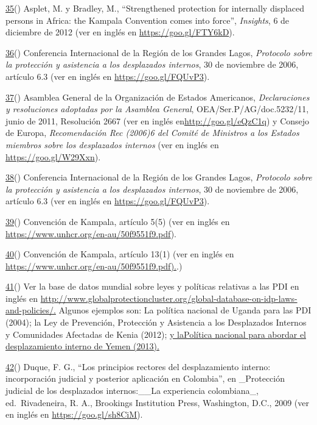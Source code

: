 \documentclass[
]{book}
\begin{document}
\protect\hyperlink{sdfootnote35anc}{35}() Asplet, M. y Bradley, M., ``Strengthened protection for internally displaced persons in Africa: the Kampala Convention comes into force'', \emph{Insights}, 6 de diciembre de 2012 (ver en inglés en \url{https://goo.gl/FTY6kD}).

\protect\hyperlink{sdfootnote36anc}{36}() Conferencia Internacional de la Región de los Grandes Lagos, \emph{Protocolo sobre la protección y asistencia a los desplazados internos}, 30 de noviembre de 2006, artículo 6.3 (ver en inglés en \url{https://goo.gl/FQUvP3}).

\protect\hyperlink{sdfootnote37anc}{37}() Asamblea General de la Organización de Estados Americanos, \emph{Declaraciones y resoluciones adoptadas por la Asamblea General}, OEA/Ser.P/AG/doc.5232/11, junio de 2011, Resolución 2667 (ver en inglés en\url{http://goo.gl/eQzC1q}) y Consejo de Europa, \emph{Recomendación Rec (2006)6 del Comité de Ministros a los Estados miembros sobre los desplazados internos} (ver en inglés en \url{https://goo.gl/W29Xxn}).

\protect\hyperlink{sdfootnote38anc}{38}() Conferencia Internacional de la Región de los Grandes Lagos, \emph{Protocolo sobre la protección y asistencia a los desplazados internos}, 30 de noviembre de 2006, artículo 6.3 (ver en inglés en \url{https://goo.gl/FQUvP3}).

\protect\hyperlink{sdfootnote39anc}{39}() Convención de Kampala, artículo 5(5) (ver en inglés en \url{https://www.unhcr.org/en-au/50f9551f9.pdf}).

\protect\hyperlink{sdfootnote40anc}{40}() Convención de Kampala, artículo 13(1) (ver en inglés en \href{https://goo.gl/BrdqYX}{https://www.unhcr.org/en-au/50f9551f9.pdf).}.)

\protect\hyperlink{sdfootnote41anc}{41}() Ver la base de datos mundial sobre leyes y políticas relativas a las PDI en inglés en \href{http://www.globalprotectioncluster.org/global-database-on-idp-laws-and-policies/}{http://www.globalprotectioncluster.org/global-database-on-idp-laws-and-policies/.} Algunos ejemplos son: La política nacional de Uganda para las PDI (2004); la Ley de Prevención, Protección y Asistencia a los Desplazados Internos y Comunidades Afectadas de Kenia (2012); \href{http://www.internal-displacement.org/law-and-policy}{y la}\href{http://www.internal-displacement.org/law-and-policy}{Política nacional para abordar el desplazamiento interno de Yemen (2013).}

\protect\hyperlink{sdfootnote42anc}{42}() Duque, F. G., ``Los principios rectores del desplazamiento interno: incorporación judicial y posterior aplicación en Colombia'', en \_Protección judicial de los desplazados internos:\_\_La experiencia colombiana\_, ed.~Rivadeneira, R. A., Brookings Institution Press, Washington, D.C., 2009 (ver en inglés en \url{https://goo.gl/sh8CiM}).
\end{document}
